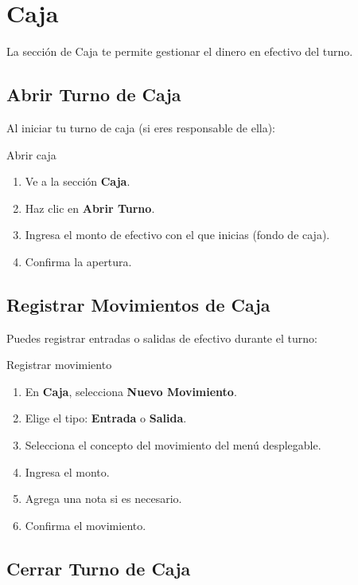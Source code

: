 \documentclass[12pt,a4paper]{article}
\begin{document}
\newpage
\section{Caja}

La sección de Caja te permite gestionar el dinero en efectivo del turno.

\subsection{Abrir Turno de Caja}

Al iniciar tu turno de caja (si eres responsable de ella):

\begin{pasobox}{Abrir caja}
\begin{enumerate}[leftmargin=*]
  \item Ve a la sección \textbf{Caja}.
  \item Haz clic en \textbf{Abrir Turno}.
  \item Ingresa el monto de efectivo con el que inicias (fondo de caja).
  \item Confirma la apertura.
\end{enumerate}
\end{pasobox}

\subsection{Registrar Movimientos de Caja}

Puedes registrar entradas o salidas de efectivo durante el turno:

\begin{pasobox}{Registrar movimiento}
\begin{enumerate}[leftmargin=*]
  \item En \textbf{Caja}, selecciona \textbf{Nuevo Movimiento}.
  \item Elige el tipo: \textbf{Entrada} o \textbf{Salida}.
  \item Selecciona el concepto del movimiento del menú desplegable.
  \item Ingresa el monto.
  \item Agrega una nota si es necesario.
  \item Confirma el movimiento.
\end{enumerate}
\end{pasobox}

\subsection{Cerrar Turno de Caja}
\end{document}
